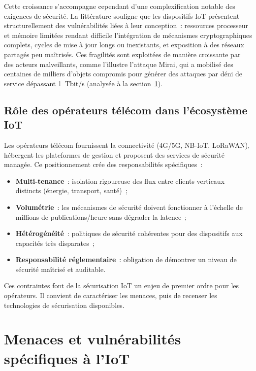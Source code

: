 Cette croissance s'accompagne cependant d'une complexification notable des exigences de sécurité. La littérature souligne que les dispositifs IoT présentent structurellement des vulnérabilités liées à leur conception~: ressources processeur et mémoire limitées rendant difficile l'intégration de mécanismes cryptographiques complets, cycles de mise à jour longs ou inexistants, et exposition à des réseaux partagés peu maîtrisés. Ces fragilités sont exploitées de manière croissante par des acteurs malveillants, comme l'illustre l'attaque Mirai, qui a mobilisé des centaines de milliers d'objets compromis pour générer des attaques par déni de service dépassant 1~Tbit/s (analysée à la section~\ref{sec:ea-menaces}).

\subsection{Rôle des opérateurs télécom dans l'écosystème IoT}

Les opérateurs télécom fournissent la connectivité (4G/5G, NB-IoT, LoRaWAN), hébergent les plateformes de gestion et proposent des services de sécurité managée. Ce positionnement crée des responsabilités spécifiques~:

\begin{itemize}[leftmargin=*]
  \item \textbf{Multi-tenance}~: isolation rigoureuse des flux entre clients verticaux distincts (énergie, transport, santé)~;
  \item \textbf{Volumétrie}~: les mécanismes de sécurité doivent fonctionner à l'échelle de millions de publications/heure sans dégrader la latence~;
  \item \textbf{Hétérogénéité}~: politiques de sécurité cohérentes pour des dispositifs aux capacités très disparates~;
  \item \textbf{Responsabilité réglementaire}~: obligation de démontrer un niveau de sécurité maîtrisé et auditable.
\end{itemize}

Ces contraintes font de la sécurisation IoT un enjeu de premier ordre pour les opérateurs. Il convient de caractériser les menaces, puis de recenser les technologies de sécurisation disponibles.

\section{Menaces et vulnérabilités spécifiques à l'IoT}
\label{sec:ea-menaces}

